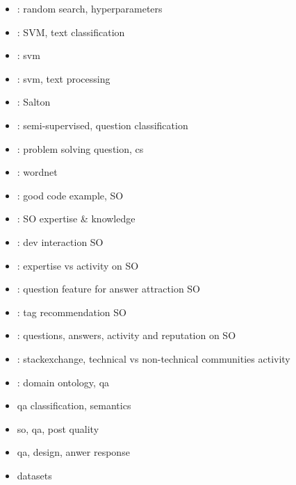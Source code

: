 \begin{itemize}
	\item \cite{BergstraBengio2012}: random search, hyperparameters
	\item \cite{TongKoller2002}: SVM, text classification
	\item \cite{HearstDumaisOsmanEtAl1998}: svm
	\item \cite{Kaestner2013}: svm, text processing
	\item \cite{Dubin2004}: Salton	
	\item \cite{NguyenNguyenShimazu2008}: semi-supervised, question classification
	\item \cite{RagonisShilo2013}: problem solving question, cs
	\item \cite{Miller1995}: wordnet	
	\item \cite{NasehiSillitoMaurerEtAl2012}: good code example, SO
	\item \cite{HanrahanConvertinoNelson2012}: SO expertise \& knowledge
	\item \cite{WangLoJiang2013}: dev interaction SO
	\item \cite{YangTaoBozzonEtAl2014}: expertise vs activity on SO
	\item \cite{ChengSchiffWu2013}: question feature for answer attraction SO
	\item \cite{ShortWongZeng2014}: tag recommendation SO
	\item \cite{PosnettWarburgDevanbuEtAl2012}: questions, answers, activity and reputation on SO
	\item \cite{AhmedYangJohri2015}: stackexchange, technical vs non-technical communities activity
	\item \cite{FuJiaXu2008}: domain ontology, qa
	\item \cite{LiRoth2002,LiRoth,LiRothSmall} qa classification, semantics
	\item \cite{AndersonHuttenlocherKleinbergEtAl2012} so, qa, post quality	
	\item \cite{SinhaManiGupta2013} qa, design, anwer response	
	\item \cite{Klein2016,SpaceMachine.net2016,Wissner-Gross2016} datasets
\end{itemize}

